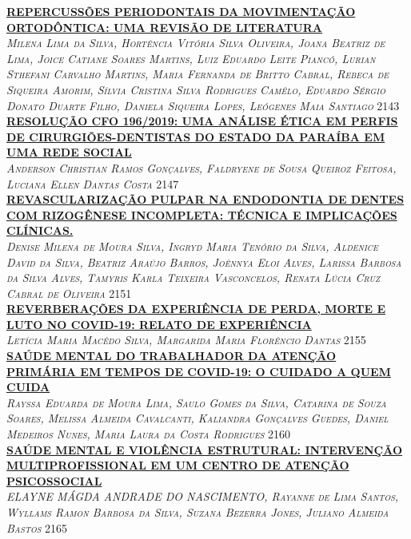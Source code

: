 \noindent \textsc{\hyperlink{trabalhos/249716.pdf.1}{\textbf{REPERCUSSÕES PERIODONTAIS DA MOVIMENTAÇÃO ORTODÔNTICA: UMA REVISÃO DE LITERATURA}}}\\ 
\noindent \textsc{\textit{Milena Lima da Silva, Hortência Vitória Silva Oliveira, Joana Beatriz de Lima, Joice Catiane Soares Martins, Luiz Eduardo Leite Piancó, Lurian Sthefani Carvalho Martins, Maria Fernanda de Britto Cabral, Rebeca de Siqueira Amorim, Sílvia Cristina Silva Rodrigues Camêlo, Eduardo Sérgio Donato Duarte Filho, Daniela Siqueira Lopes, Leógenes Maia Santiago}} \hfill 2143\\ 

\noindent \textsc{\hyperlink{trabalhos/251651.pdf.1}{\textbf{RESOLUÇÃO CFO 196/2019: UMA ANÁLISE ÉTICA EM PERFIS DE CIRURGIÕES-DENTISTAS DO ESTADO DA PARAÍBA EM UMA REDE SOCIAL}}}\\ 
\noindent \textsc{\textit{Anderson Christian Ramos Gonçalves, Faldryene de Sousa Queiroz Feitosa, Luciana Ellen Dantas Costa}} \hfill 2147\\ 

\noindent \textsc{\hyperlink{trabalhos/251495.pdf.1}{\textbf{REVASCULARIZAÇÃO PULPAR NA ENDODONTIA DE DENTES COM RIZOGÊNESE INCOMPLETA: TÉCNICA E IMPLICAÇÕES CLÍNICAS.}}}\\ 
\noindent \textsc{\textit{Denise Milena de Moura Silva, Ingryd Maria Tenório da Silva, Aldenice David da Silva, Beatriz Araújo Barros, Joênnya Eloi Alves, Larissa Barbosa da Silva Alves, Tamyris Karla Teixeira Vasconcelos, Renata Lúcia Cruz Cabral de Oliveira}} \hfill 2151\\ 

\noindent \textsc{\hyperlink{trabalhos/250810.pdf.1}{\textbf{REVERBERAÇÕES DA EXPERIÊNCIA DE PERDA, MORTE E LUTO NO COVID-19: RELATO DE EXPERIÊNCIA}}}\\ 
\noindent \textsc{\textit{Letícia Maria Macêdo Silva, Margarida Maria Florêncio Dantas}} \hfill 2155\\ 

\noindent \textsc{\hyperlink{trabalhos/251626.pdf.1}{\textbf{SAÚDE MENTAL DO TRABALHADOR DA ATENÇÃO PRIMÁRIA EM TEMPOS DE COVID-19: O CUIDADO A QUEM CUIDA}}}\\ 
\noindent \textsc{\textit{Rayssa Eduarda de Moura Lima, Saulo Gomes da Silva, Catarina de Souza Soares, Melissa Almeida Cavalcanti, Kaliandra Gonçalves Guedes, Daniel Medeiros Nunes, Maria Laura da Costa Rodrigues}} \hfill 2160\\ 

\noindent \textsc{\hyperlink{trabalhos/251312.pdf.1}{\textbf{SAÚDE MENTAL E VIOLÊNCIA ESTRUTURAL: INTERVENÇÃO MULTIPROFISSIONAL EM UM CENTRO DE ATENÇÃO PSICOSSOCIAL}}}\\ 
\noindent \textsc{\textit{ELAYNE MÁGDA ANDRADE DO NASCIMENTO, Rayanne de Lima Santos, Wyllams Ramon Barbosa da Silva, Suzana Bezerra Jones, Juliano Almeida Bastos}} \hfill 2165\\ 

